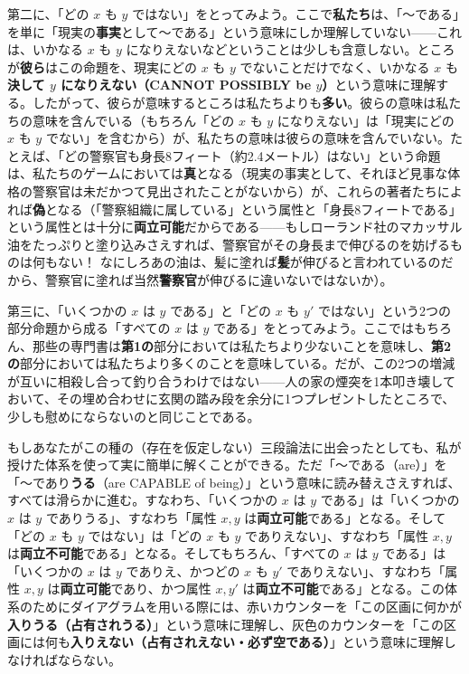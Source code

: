\documentclass[a4paper,11pt,openany]{ltjsbook}
\begin{document}
第二に、「どの $x$ も $y$ ではない」をとってみよう。ここで\textbf{私たち}は、「〜である」を単に「現実の\textbf{事実}として〜である」という意味にしか理解していない——これは、いかなる $x$ も $y$ になりえないなどということは少しも含意しない。ところが\textbf{彼ら}はこの命題を、現実にどの $x$ も $y$ でないことだけでなく、いかなる $x$ も\textbf{決して $y$ になりえない（CANNOT POSSIBLY be $y$）}という意味に理解する。したがって、彼らが意味するところは私たちよりも\textbf{多い}。彼らの意味は私たちの意味を含んでいる（もちろん「どの $x$ も $y$ になりえない」は「現実にどの $x$ も $y$ でない」を含むから）が、私たちの意味は彼らの意味を含んでいない。たとえば、「どの警察官も身長8フィート（約2.4メートル）はない」という命題は、私たちのゲームにおいては\textbf{真}となる（現実の事実として、それほど見事な体格の警察官は未だかつて見出されたことがないから）が、これらの著者たちによれば\textbf{偽}となる（「警察組織に属している」という属性と「身長8フィートである」という属性とは十分に\textbf{両立可能}だからである——もしローランド社のマカッサル油をたっぷりと塗り込みさえすれば、警察官がその身長まで伸びるのを妨げるものは何もない！ なにしろあの油は、髪に塗れば\textbf{髪}が伸びると言われているのだから、警察官に塗れば当然\textbf{警察官}が伸びるに違いないではないか）。

第三に、「いくつかの $x$ は $y$ である」と「どの $x$ も $y'$ ではない」という2つの部分命題から成る「すべての $x$ は $y$ である」をとってみよう。ここではもちろん、那些の専門書は\textbf{第1の}部分においては私たちより少ないことを意味し、\textbf{第2の}部分においては私たちより多くのことを意味している。だが、この2つの増減が互いに相殺し合って釣り合うわけではない——人の家の煙突を1本叩き壊しておいて、その埋め合わせに玄関の踏み段を余分に1つプレゼントしたところで、少しも慰めにならないのと同じことである。

もしあなたがこの種の（存在を仮定しない）三段論法に出会ったとしても、私が授けた体系を使って実に簡単に解くことができる。ただ「〜である（are）」を「〜であり\textbf{うる}（are CAPABLE of being）」という意味に読み替えさえすれば、すべては滑らかに進む。すなわち、「いくつかの $x$ は $y$ である」は「いくつかの $x$ は $y$ でありうる」、すなわち「属性 $x, y$ は\textbf{両立可能}である」となる。そして「どの $x$ も $y$ ではない」は「どの $x$ も $y$ でありえない」、すなわち「属性 $x, y$ は\textbf{両立不可能}である」となる。そしてもちろん、「すべての $x$ は $y$ である」は「いくつかの $x$ は $y$ でありえ、かつどの $x$ も $y'$ でありえない」、すなわち「属性 $x, y$ は\textbf{両立可能}であり、かつ属性 $x, y'$ は\textbf{両立不可能}である」となる。この体系のためにダイアグラムを用いる際には、赤いカウンターを「この区画に何かが\textbf{入りうる（占有されうる）}」という意味に理解し、灰色のカウンターを「この区画には何も\textbf{入りえない（占有されえない・必ず空である）}」という意味に理解しなければならない。
\end{document}
